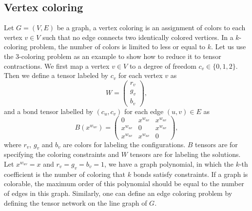 \documentclass[onefignum, onetabnum]{siamart190516}
\newcommand{\<}{\langle}
\renewcommand{\>}{\rangle}
\newcounter{example}
\begin{document}
\subsection{Vertex coloring}
Let $G=(V,E)$ be a graph, a vertex coloring is an assignment of colors to each vertex $v\in V$ such that no edge connects two identically colored vertices. 
In a $k$-coloring problem, the number of colors is limited to less or equal to $k$.
Let us use the 3-coloring problem as an example to show how to reduce it to tensor contractions.
We first map a vertex $v \in V$ to a degree of freedom $c_v\in\{0,1,2\}$.
Then we define a tensor labeled by $c_v$ for each vertex $v$ as
\begin{equation}
    W = \left(\begin{matrix}
        r_v\\
        g_v\\
        b_v
    \end{matrix}\right),
\end{equation}
and a bond tensor labelled by $(c_u, c_v) $ for each edge $(u, v) \in E$ as
\begin{equation}
    B(x^{w_{uv}}) = \left(\begin{matrix}
        0 & x^{w_{uv}} & x^{w_{uv}}\\
        x^{w_{uv}} & 0 & x^{w_{uv}}\\
        x^{w_{uv}} & x^{w_{uv}} & 0
    \end{matrix}\right),
\end{equation}
where $r_v$, $g_v$ and $b_v$ are colors for labeling the configurations. $B$ tensors are for specifying the coloring constraints and $W$ tensors are for labeling the solutions.
Let $x^{w_{uv}} = x$ and $r_v = g_v = b_v = 1$, we have a graph polynomial,
in which the $k$-th coefficient is the number of coloring that $k$ bonds satisfy constraints.
If a graph is colorable, the maximum order of this polynomial should be equal to the number of edges in this graph.
Similarly, one can define an edge coloring problem by defining the tensor network on the line graph of $G$.
\end{document}
